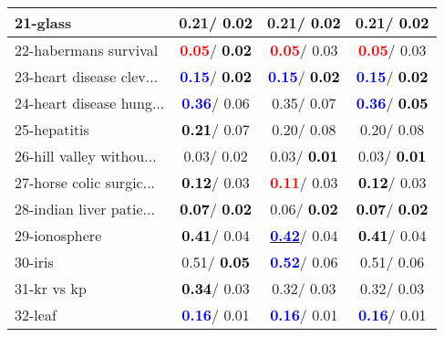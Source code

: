 \begin{table}[h]
\begin{center}
\begin{tabular}{lc|c|c}
21-glass &   0.21/\textcolor{black}{\textbf{  0.02}} &   0.21/\textcolor{black}{\textbf{  0.02}} &   0.21/\textcolor{black}{\textbf{  0.02}} \\ \hline
22-habermans survival & \textcolor{red}{\textbf{  0.05}}/\textcolor{black}{\textbf{  0.02}} & \textcolor{red}{\textbf{  0.05}}/  0.03 & \textcolor{red}{\textbf{  0.05}}/  0.03 \\
23-heart disease clev... & \textcolor{blue}{\textbf{  0.15}}/\textcolor{black}{\textbf{  0.02}} & \textcolor{blue}{\textbf{  0.15}}/\textcolor{black}{\textbf{  0.02}} & \textcolor{blue}{\textbf{  0.15}}/\textcolor{black}{\textbf{  0.02}} \\
24-heart disease hung... & \textcolor{blue}{\textbf{  0.36}}/  0.06 &   0.35/  0.07 & \textcolor{blue}{\textbf{  0.36}}/\textcolor{black}{\textbf{  0.05}} \\
25-hepatitis & \textcolor{black}{\textbf{  0.21}}/  0.07 &   0.20/  0.08 &   0.20/  0.08 \\
26-hill valley withou... &   0.03/  0.02 &   0.03/\textcolor{black}{\textbf{  0.01}} &   0.03/\textcolor{black}{\textbf{  0.01}} \\
27-horse colic surgic... & \textcolor{black}{\textbf{  0.12}}/  0.03 & \textcolor{red}{\textbf{  0.11}}/  0.03 & \textcolor{black}{\textbf{  0.12}}/  0.03 \\
28-indian liver patie... & \textcolor{black}{\textbf{  0.07}}/\textcolor{black}{\textbf{  0.02}} &   0.06/\textcolor{black}{\textbf{  0.02}} & \textcolor{black}{\textbf{  0.07}}/\textcolor{black}{\textbf{  0.02}} \\ \hline
29-ionosphere & \textcolor{black}{\textbf{  0.41}}/  0.04 & \underline{\textcolor{blue}{\textbf{  0.42}}}/  0.04 & \textcolor{black}{\textbf{  0.41}}/  0.04 \\
30-iris &   0.51/\textcolor{black}{\textbf{  0.05}} & \textcolor{blue}{\textbf{  0.52}}/  0.06 &   0.51/  0.06 \\
31-kr vs kp & \textcolor{black}{\textbf{  0.34}}/  0.03 &   0.32/  0.03 &   0.32/  0.03 \\
32-leaf & \textcolor{blue}{\textbf{  0.16}}/  0.01 & \textcolor{blue}{\textbf{  0.16}}/  0.01 & \textcolor{blue}{\textbf{  0.16}}/  0.01 \\\end{tabular}\label{stratsALCKappa0bCIELMRedux}
\end{center}
\end{table}
